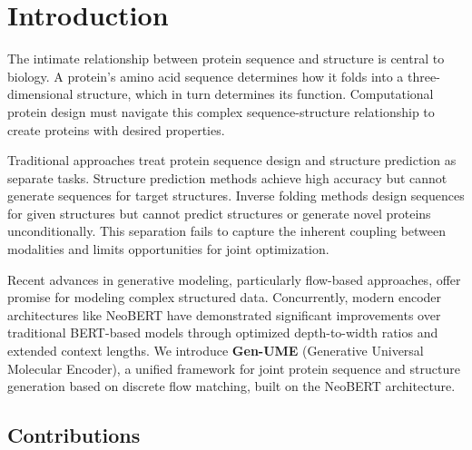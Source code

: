 \documentclass[11pt,a4paper]{article}
\newcommand{\genume}{Gen-UME}
\begin{document}
\section{Introduction}

The intimate relationship between protein sequence and structure is central to biology. A protein's amino acid sequence determines how it folds into a three-dimensional structure, which in turn determines its function. Computational protein design must navigate this complex sequence-structure relationship to create proteins with desired properties.

Traditional approaches treat protein sequence design and structure prediction as separate tasks. Structure prediction methods achieve high accuracy but cannot generate sequences for target structures. Inverse folding methods design sequences for given structures but cannot predict structures or generate novel proteins unconditionally. This separation fails to capture the inherent coupling between modalities and limits opportunities for joint optimization.

Recent advances in generative modeling, particularly flow-based approaches, offer promise for modeling complex structured data. Concurrently, modern encoder architectures like NeoBERT \cite{lebreton2025} have demonstrated significant improvements over traditional BERT-based models through optimized depth-to-width ratios and extended context lengths. We introduce \textbf{\genume} (Generative Universal Molecular Encoder), a unified framework for joint protein sequence and structure generation based on discrete flow matching, built on the NeoBERT architecture.

\subsection{Contributions}
\end{document}

